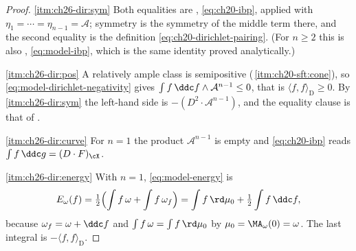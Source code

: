 \begin{proof}
\cref{itm:ch26-dir:sym}  Both equalities are
, \eqref{eq:ch20-ibp}, applied with
$\eta_1=\cdots=\eta_{n-1}=\mathcal A$; symmetry is the symmetry of the
middle term there, and the second equality is the definition
\eqref{eq:ch20-dirichlet-pairing}.  (For $n\geq2$ this is also
, \eqref{eq:model-ibp}, which is the
same identity proved analytically.)

\cref{itm:ch26-dir:pos}  A relatively ample class is semipositive
(\,\cref{itm:ch20-sft:cone}), so
\eqref{eq:model-dirichlet-negativity} gives
$\int f\,\ddc f\wedge\mathcal A^{n-1}\leq0$, that is
$\langle f,f\rangle_{\mathrm D}\geq0$.  By
\cref{itm:ch26-dir:sym} the left-hand side is
$-(D^2\cdot\mathcal A^{n-1})$, and the equality clause is that of
.

\cref{itm:ch26-dir:curve}  For $n=1$ the product
$\mathcal A^{n-1}$ is empty and \eqref{eq:ch20-ibp} reads
$\int f\,\ddc g=(D\cdot F)_{\cX}$.

\cref{itm:ch26-dir:energy}  With $n=1$, \eqref{eq:model-energy} is
\[
 E_\omega(f)=\tfrac12\Bigl(\int f\,\omega+\int f\,\omega_f\Bigr)
 =\int f\,\rd\mu_0+\tfrac12\int f\,\ddc f ,
\]
because $\omega_f=\omega+\ddc f$ and $\int f\,\omega=\int f\,\rd\mu_0$ by
$\mu_0=\MA_\omega(0)=\omega$.  The last integral is
$-\langle f,f\rangle_{\mathrm D}$.
\end{proof}

